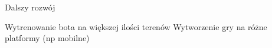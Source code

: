 \begin{frame}{Dalszy rozwój}

	\begin{itemize}
		\myitem Wytrenowanie bota na większej ilości terenów
		\myitem Wytworzenie gry na różne platformy (np mobilne) 
	\end{itemize}

\end{frame}
